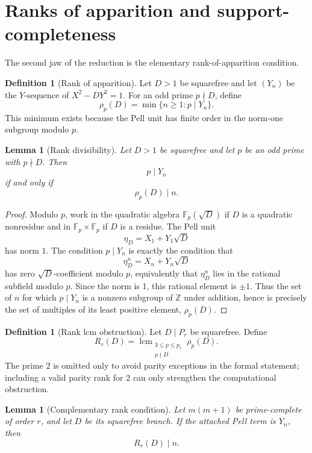 \documentclass[11pt]{article}
\newtheorem{lemma}[theorem]{Lemma}
\theoremstyle{definition}
\newtheorem{definition}[theorem]{Definition}
\newcommand{\lcm}{\operatorname{lcm}}
\newcommand{\Z}{\mathbb{Z}}
\begin{document}
\section{Ranks of apparition and support-completeness}

The second jaw of the reduction is the elementary rank-of-apparition condition.

\begin{definition}[Rank of apparition]\label{def:rank}
Let $D>1$ be squarefree and let $(Y_n)$ be the $Y$-sequence of $X^2-DY^2=1$.  
For an odd prime $p\nmid D$, define
\[
        \rho_p(D)=\min\{n\ge1:p\mid Y_n\}.
\]
This minimum exists because the Pell unit has finite order in the norm-one 
subgroup modulo $p$.
\end{definition}

\begin{lemma}[Rank divisibility]\label{lem:rank-divisibility}
Let $D>1$ be squarefree and let $p$ be an odd prime with $p \nmid D$.  Then
\[
        p\mid Y_n
\]
if and only if
\[
        \rho_p(D)\mid n.
\]
\end{lemma}

\begin{proof}
Modulo $p$, work in the quadratic algebra $\mathbb F_p(\sqrt D)$ if $D$ is a 
quadratic nonresidue and in $\mathbb F_p\times\mathbb F_p$ if $D$ is a residue.  The Pell unit
\[
        \eta_D=X_1+Y_1\sqrt D
\]
has norm $1$.  The condition $p\mid Y_n$ is exactly the condition that
\[
        \eta_D^n=X_n+Y_n\sqrt D
\]
has zero $\sqrt D$-coefficient modulo $p$, equivalently that $\eta_D^n$ lies in the 
rational subfield modulo $p$.  Since the norm is 1, this rational element is $\pm 1$.  
Thus the set of $n$ for which $p\mid Y_n$ is a nonzero subgroup of $\Z$ under addition, 
hence is precisely the set of multiples of its least positive element, $\rho_p(D)$.
\end{proof}

\begin{definition}[Rank lcm obstruction]
Let $D\mid P_r$ be squarefree.  Define
\[
        R_r(D)
        =
        \lcm_{\substack{3\le p\le p_r\\ p\nmid D}} \rho_p(D).
\]
The prime $2$ is omitted only to avoid parity exceptions in the formal statement; 
including a valid parity rank for 2 can only strengthen the computational obstruction.
\end{definition}

\begin{lemma}[Complementary rank condition]\label{lem:rank-condition}
Let $m(m+1)$ be prime-complete of order $r$, and let $D$ be its squarefree branch.  
If the attached Pell term is $Y_n$, then
\[
        R_r(D)\mid n.
\]
\end{lemma}
\end{document}

